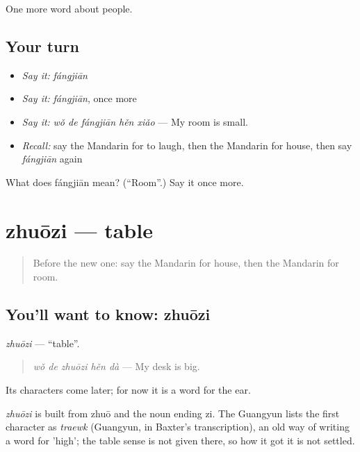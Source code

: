 \begin{grammarlens}[title={What you've built}]
One more word about people.
\end{grammarlens}

\subsection*{Your turn}
\begin{itemize}
\raggedright
  \item \emph{Say it:} \emph{fángjiān}
  \item \emph{Say it:} \emph{fángjiān}, once more
  \item \emph{Say it:} \emph{wǒ de fángjiān hěn xiǎo} — My room is small.
  \item \emph{Recall:} say the Mandarin for to laugh, then the Mandarin for house, then say \emph{fángjiān} again
\end{itemize}

\begin{tcolorbox}[breakable,colback=teal!4,colframe=teal!35!black,title={Before you move on}]
What does fángjiān mean? (\textquotedblleft{}Room\textquotedblright{}.) Say it once more.
\end{tcolorbox}
\section[zhuōzi]{zhuōzi — table}

\label{lesson:ZH-C57-zhuozi}



\begin{quote}
Before the new one: say the Mandarin for house, then the Mandarin for room.
\end{quote}

\subsection*{You'll want to know: zhuōzi}
\emph{zhuōzi} — \textquotedblleft{}table\textquotedblright{}.

\begin{quote}
\emph{wǒ de zhuōzi hěn dà} — My desk is big.
\end{quote}

Its characters come later; for now it is a word for the ear.

\begin{cousinweb}
\emph{zhuōzi} is built from zhuō and the noun ending zi. The Guangyun lists the first character as \emph{traewk} (Guangyun, in Baxter's transcription), an old way of writing a word for 'high'; the table sense is not given there, so how it got it is not settled.
\end{cousinweb}

